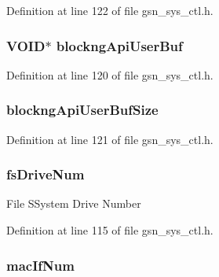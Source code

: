 Definition at line 122 of file gsn\_\-sys\_\-ctl.h.

\hypertarget{a00248_a578079528c6283b8779beb3a12945bf9}{
\subsubsection[{blockngApiUserBuf}]{\setlength{\rightskip}{0pt plus 5cm}VOID$\ast$ {\bf blockngApiUserBuf}}}
\label{a00248_a578079528c6283b8779beb3a12945bf9}


Definition at line 120 of file gsn\_\-sys\_\-ctl.h.

\hypertarget{a00248_ad828642fbf78687924f94c89931c9e13}{
\subsubsection[{blockngApiUserBufSize}]{ {\bf blockngApiUserBufSize}}}
\label{a00248_ad828642fbf78687924f94c89931c9e13}


Definition at line 121 of file gsn\_\-sys\_\-ctl.h.

\hypertarget{a00248_a608e9ec21e3e188328d47a7bba1483ec}{
\subsubsection[{fsDriveNum}]{ {\bf fsDriveNum}}}
\label{a00248_a608e9ec21e3e188328d47a7bba1483ec}
File SSystem Drive Number 

Definition at line 115 of file gsn\_\-sys\_\-ctl.h.

\hypertarget{a00248_ae57ae92e651751e7978e237c55133b4c}{
\subsubsection[{macIfNum}]{ {\bf macIfNum}}}
\label{a00248_ae57ae92e651751e7978e237c55133b4c}


